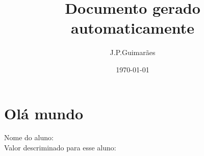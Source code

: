 \documentclass[11pt]{article}
\title{ Documento gerado automaticamente}
\author{ J.P.Guimarães }
\date{\today}
\begin{document}
\maketitle	

\section{Olá mundo}

Nome do aluno: \nomealuno 
\\

Valor descriminado para esse aluno: \valorquestao
\end{document}
